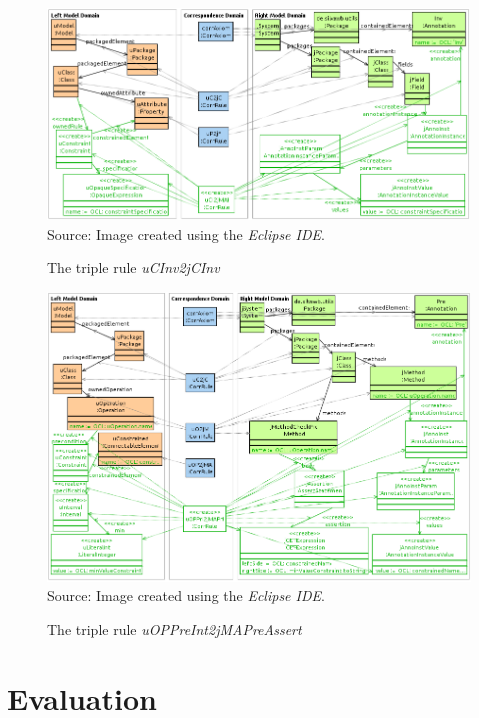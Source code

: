 \documentclass[tuberlin,cic,tc,english,noabntcite, oneside]{iiufrgs}
\begin{document}
\begin{figure}[H]
    \centering
    \caption{The triple rule \emph{uCInv2jCInv}}
    \includegraphics[width=\textwidth]{uCInv2jCInv} \\
    Source: Image created using the \emph{Eclipse IDE}.
    \label{fig:uCInv2jCInv}
\end{figure}
\begin{figure}[H]
	\centering
    \caption{The triple rule \emph{uOPPreInt2jMAPreAssert}}
    \includegraphics[width=\textwidth]{uOPPreInt2jMAPreAssert} \\
    Source: Image created using the \emph{Eclipse IDE}.
    \label{fig:uOPPreInt2jMAPreAssert}
\end{figure}

\section{Evaluation}
\label{subsec:Evaluation}
\end{document}
